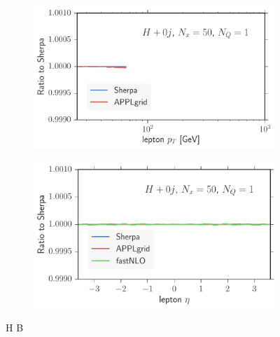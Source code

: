 \begin{figure}
\begin{subfigure}[]{0.49\textwidth}
	\includegraphics[width=\textwidth]{images/hb_lpt.pdf}
\end{subfigure}
\hfill
\begin{subfigure}[]{0.49\textwidth}
	\includegraphics[width=\textwidth]{images/hb_leta.pdf}
\end{subfigure}
\caption{H B}
\end{figure}
%
